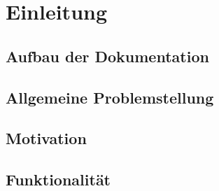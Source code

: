 \chapter{Einleitung}\label{ch:einleitung}

\section{Aufbau der Dokumentation}

\section{Allgemeine Problemstellung}

\section{Motivation}

\section{Funktionalität}